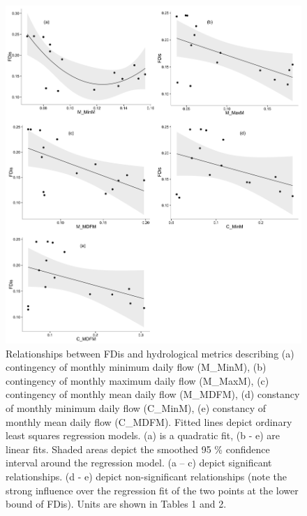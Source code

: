 \documentclass[openright,12pt,a4paper]{memoir}
\begin{document}
\begin{figure}[ht]
\begin{center}
\includegraphics[width=\textwidth,keepaspectratio=true]{fig2.png} %
\caption[Relationships between FDis and hydrological metrics describing variability in seasonal water availability (1).]{\small{Relationships between FDis and hydrological metrics describing (a) contingency of monthly minimum daily flow (M\_MinM), (b) contingency of monthly maximum daily flow (M\_MaxM), (c) contingency of monthly mean daily flow (M\_MDFM), (d) constancy of monthly minimum daily flow (C\_MinM), (e) constancy of monthly mean daily flow (C\_MDFM). Fitted lines depict ordinary least squares regression models. (a) is a quadratic fit, (b - e) are linear fits. Shaded areas depict the smoothed 95 \% confidence interval around the regression model. (a – c) depict significant relationships. (d - e) depict non-significant relationships (note the strong influence over the regression fit of the two points at the lower bound of FDis). Units are shown in Tables 1 and 2.}}
\label{Ch3_F2} %
\end{center}
\end{figure}   
\clearpage
\end{document}
